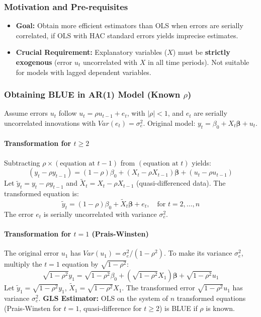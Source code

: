 \documentclass[a4paper, 10pt]{article}
\theoremstyle{definition}	%
\begin{document}
\subsubsection{Motivation and Pre-requisites}
\begin{itemize}
    \item \textbf{Goal:} Obtain more efficient estimators than OLS when errors are serially correlated, if OLS with HAC standard errors yields imprecise estimates.
    \item \textbf{Crucial Requirement:} Explanatory variables (\(X\)) must be \textbf{strictly exogenous} (error \(u_t\) uncorrelated with \(X\) in all time periods). Not suitable for models with lagged dependent variables.
\end{itemize}

\subsubsection{Obtaining BLUE in AR(1) Model (Known \(\rho\))}
Assume errors \(u_t\) follow \(u_t = \rho u_{t-1} + e_t\), with \(|\rho|<1\), and \(e_t\) are serially uncorrelated innovations with \(Var(e_t)=\sigma_e^2\).
Original model: \(y_t = \beta_0 + X_t\boldsymbol{\beta} + u_t\).

\paragraph{Transformation for \(t \ge 2\)}
Subtracting \(\rho \times (\text{equation at } t-1)\) from \((\text{equation at } t)\) yields:
\[ (y_t - \rho y_{t-1}) = (1-\rho)\beta_0 + (X_t - \rho X_{t-1})\boldsymbol{\beta} + (u_t - \rho u_{t-1}) \]
Let \(\tilde{y}_t = y_t - \rho y_{t-1}\) and \(\tilde{X}_t = X_t - \rho X_{t-1}\) (quasi-differenced data).
The transformed equation is:
\begin{equation} \label{eq:quasi_diff_known_rho}
\tilde{y}_t = (1-\rho)\beta_0 + \tilde{X}_t\boldsymbol{\beta} + e_t, \quad \text{for } t=2, \dots, n
\end{equation}
The error \(e_t\) is serially uncorrelated with variance \(\sigma_e^2\).

\paragraph{Transformation for \(t=1\) (Prais-Winsten)}
The original error \(u_1\) has \(Var(u_1) = \sigma_e^2 / (1-\rho^2)\). To make its variance \(\sigma_e^2\), multiply the \(t=1\) equation by \(\sqrt{1-\rho^2}\):
\[ \sqrt{1-\rho^2} y_1 = \sqrt{1-\rho^2} \beta_0 + (\sqrt{1-\rho^2} X_1)\boldsymbol{\beta} + \sqrt{1-\rho^2} u_1 \]
Let \(\tilde{y}_1 = \sqrt{1-\rho^2} y_1\), \(\tilde{X}_1 = \sqrt{1-\rho^2} X_1\). The transformed error \(\sqrt{1-\rho^2} u_1\) has variance \(\sigma_e^2\).
\textbf{GLS Estimator:} OLS on the system of \(n\) transformed equations (Prais-Winsten for \(t=1\), quasi-difference for \(t \ge 2\)) is BLUE if \(\rho\) is known.
\end{document}
